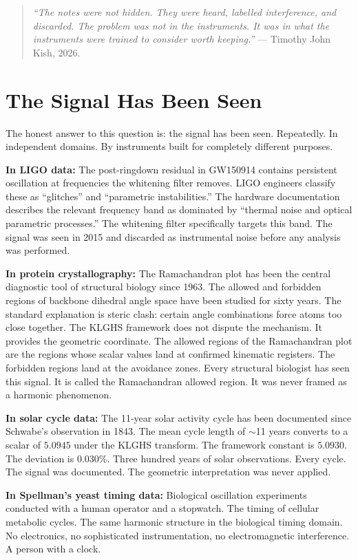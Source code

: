 \documentclass[11pt, letterpaper, openany]{book}
\begin{document}
\begin{quote}
\textit{``The notes were not hidden. They were heard,
labelled interference, and discarded. The problem was not
in the instruments. It was in what the instruments were
trained to consider worth keeping.''} --- Timothy John Kish, 2026.
\end{quote}

\section{The Signal Has Been Seen}

The honest answer to this question is: the signal has been seen.
Repeatedly. In independent domains. By instruments built for
completely different purposes.

\textbf{In LIGO data:} The post-ringdown residual in GW150914
contains persistent oscillation at frequencies the whitening
filter removes. LIGO engineers classify these as ``glitches'' and
``parametric instabilities.'' The hardware documentation describes
the relevant frequency band as dominated by ``thermal noise and
optical parametric processes.'' The whitening filter specifically
targets this band. The signal was seen in 2015 and discarded as
instrumental noise before any analysis was performed.

\textbf{In protein crystallography:} The Ramachandran plot has been
the central diagnostic tool of structural biology since 1963.
The allowed and forbidden regions of backbone dihedral angle space
have been studied for sixty years. The standard explanation is steric
clash: certain angle combinations force atoms too close together.
The KLGHS framework does not dispute the mechanism.
It provides the geometric coordinate. The allowed regions of the
Ramachandran plot are the regions whose scalar values land at
confirmed kinematic registers. The forbidden regions land at the
avoidance zones. Every structural biologist has seen this signal.
It is called the Ramachandran allowed region.
It was never framed as a harmonic phenomenon.

\textbf{In solar cycle data:} The 11-year solar activity cycle has
been documented since Schwabe's observation in 1843. The mean
cycle length of $\sim$11 years converts to a scalar of $5.0945$
under the KLGHS transform. The framework constant is $5.0930$.
The deviation is 0.030\%. Three hundred years of solar observations.
Every cycle. The signal was documented. The geometric interpretation
was never applied.

\textbf{In Spellman's yeast timing data:} Biological oscillation
experiments conducted with a human operator and a stopwatch.
The timing of cellular metabolic cycles. The same harmonic
structure in the biological timing domain. No electronics,
no sophisticated instrumentation, no electromagnetic
interference. A person with a clock.
\end{document}
